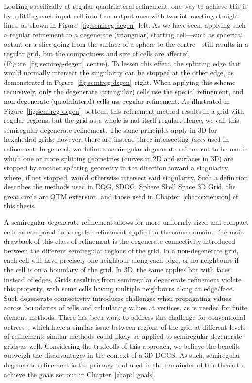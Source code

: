 Looking specifically at regular quadrilateral refinement, one way to achieve this is by splitting each input cell into four output ones with two intersecting straight lines, as shown in Figure~\ref{fig:semireg-degen}~left.
As we have seen, applying such a regular refinement to a degenerate (triangular) starting cell---such as spherical octant or a slice going from the surface of a sphere to the centre---still results in a regular grid, but the compactness and size of cells are affected (Figure~\ref{fig:semireg-degen}~centre).
To lessen this effect, the splitting edge that would normally intersect the singularity can be stopped at the other edge, as demonstrated in Figure~\ref{fig:semireg-degen}~right.
When applying this scheme recursively, only the degenerate (triangular) cells use the special refinement, and non-degenerate (quadrilateral) cells use regular refinement.
As illustrated in Figure~\ref{fig:semireg-degen}~bottom, this refinement method results in a grid with regular regions, but the grid as a whole is not itself regular.
Hence, we call this semiregular degenerate refinement.
The same principles apply in 3D for hexahedral grids; however, there are instead three intersecting \textit{faces} used in refinement.
In general, we define a semiregular degenerate refinement to be one in which one or more splitting geometries (curves in 2D and surfaces in 3D) are stopped by another splitting geometry in the direction toward a singularity where, if not stopped, would otherwise intersect said singularity.
Such a definition describes the methods used in DQG, SDOG, Sphere Shell Space 3D Grid, the great circle arc QTM extension, and those used in Chapter~\ref{chap:extension} of this thesis.


A semiregular degenerate refinement allows for more uniformly sized and compact cells as compared to a regular refinement applied to the same domain.
The main drawback of this class of refinement is the degenerate connectivity introduced between the different semiregular regions of the grid.
In a non-degenerate grid, each cell will have precisely one neighbour along each edge, or no neighbours if the cell is on a boundary of the grid.
In 3D, the same applies but with faces instead of edges.
Grids resulting from semiregular degenerate refinement violate this property, with some cells having multiple neighbours along an edge/face.
Such degenerate connectivity introduces challenges when propagating values across boundaries of cells and calculating values at vertices, as is needed for finite element methods.
There has been work to address this challenge for conventional octrees~\cite{braun2008douar}, which have a similar issue between regions of the grid at different levels of refinement; similar methods could likely be applied to semiregular degenerate grids as well.
Considering the tradeoffs of this approach, we believe the benefits outweigh the disadvantages in the context of a 3D DGGS.
As such, semiregular degenerate refinement is the primary tool used in the remainder of this thesis to achieve the goals set out in Chapter~\ref{chap:1:goals}.
